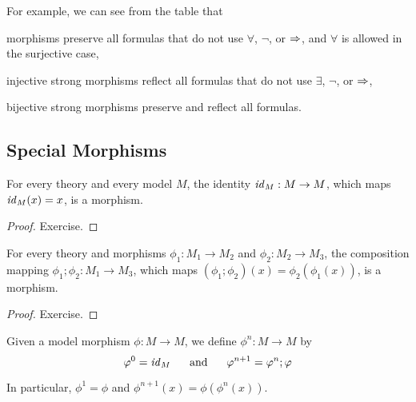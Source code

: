 For example, we can see from the table that
\begin{compactitem}
 \item morphisms preserve all formulas that do not use $\forall$, $\neg$, or $\Rightarrow$, and $\forall$ is allowed in the surjective case,
 \item injective strong morphisms reflect all formulas that do not use $\exists$, $\neg$, or $\Rightarrow$,
 \item bijective strong morphisms preserve and reflect all formulas.
\end{compactitem}

\subsection{Special Morphisms}

\begin{theorem}
For every theory and every model $M$, the identity $\mathit{id}_{M}:M\to M$, which maps $\mathit{id}_{M}(x)=x$, is a morphism.
\end{theorem}
\begin{proof}
Exercise.
\end{proof}

\begin{theorem}[Composition]
For every theory and morphisms $\phi_1:M_1\to M_2$ and $\phi_2:M_2\to M_3$, the composition mapping $\phi_1;\phi_2:M_1\to M_3$, which maps $(\phi_1;\phi_2)(x)=\phi_2(\phi_1(x))$, is a morphism.
\end{theorem}
\begin{proof}
Exercise.
\end{proof}

\begin{definition}[Powers]
Given a model morphism $\phi:M\to M$, we define $\phi^n:M\to M$ by
\[\varphi^0=\mathit{id}_{M} \hspace*{.5cm}\;\mathrm{and}\;\hspace*{.5cm} \varphi^{n+1}=\varphi^n;\varphi\]
\end{definition}

In particular, $\phi^1=\phi$ and $\phi^{n+1}(x)=\phi(\phi^n(x))$.


